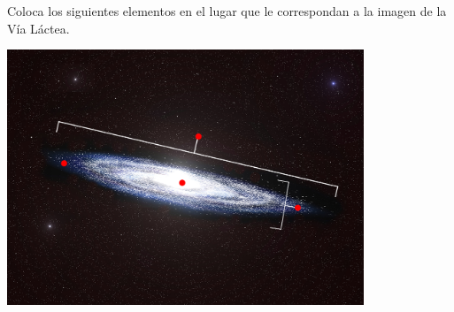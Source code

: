 Coloca los siguientes elementos en el lugar que le correspondan a la imagen de la Vía Láctea.
\begin{center}
     \quad {} \quad {} \quad {}
\end{center}
\begin{center}
    \includegraphics[width=0.8\textwidth]{Images/SINFI_AC85_IMG1_ok.jpg}
\end{center}